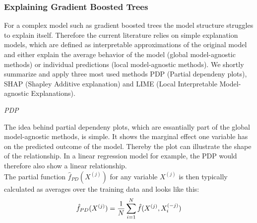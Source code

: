\documentclass[12pt,titlepage]{article}
\begin{document}
\subsubsection*{Explaining Gradient Boosted Trees}

For a complex model such as gradient boosted trees the model structure struggles to explain itself. Therefore the current literature relies on simple explanation models, which are defined as interpretable approximations of the original model and either explain the average behavior of the model (global model-agnostic methods) or individual predictions (local model-agnostic methods). We shortly summarize and apply three most used methods PDP (Partial dependeny plots), SHAP (Shapley Additive explanation) and LIME (Local Interpretable Model-agnostic Explanations).

\vspace{3mm}

\textit{PDP}

\vspace{3mm}
The idea behind partial dependeny plots, which are essantially part of the global model-agnostic methods, is simple. It shows the marginal effect one variable has on the predicted outcome of the model. Thereby the plot can illustrate the shape of the relationship. In a linear regression model for example, the PDP would therefore also show a linear relationship. \\
The partial function $\hat{f}_{PD}(X^{(j)})$ for any variable $X^{(j)}$ is then typically calculated as averages over the training data and looks like this: \\

\begin{equation} \label{pdp}
    \hat{f}_{PD}(X^{(j)}) = \frac{1}{N} \sum_{i=1}^{N} \hat{f}(X^{(j)}, X^{(-j)}_{i}) \\
\end{equation}
\end{document}
